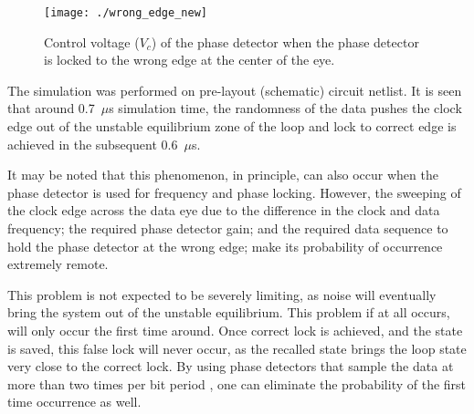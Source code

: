 \documentclass[journal,twoside,letterpaper]{IEEEtran}
\begin{document}
\begin{figure}[h!]
\centering
{}
\texttt{[image: ./wrong\_edge\_new]}
\caption{Control voltage ($V_c$) of the phase detector when the phase detector is locked
to the wrong edge at the center of the eye.}
\label{fig:Alex_wrong_edge}
\end{figure}

The
simulation was performed on pre-layout (schematic) circuit netlist. It is seen that
around \mbox{0.7 $\mu$s} simulation time, the randomness of the data pushes the clock edge out
of the unstable equilibrium zone of the loop and lock to correct edge is achieved in the subsequent
\mbox{0.6 $\mu$s.}

It may be noted that this phenomenon, in principle, can also occur when the phase detector
is used for frequency and phase locking. However, the sweeping of the clock edge across the
data eye due to the difference in the clock and data frequency; the required phase detector gain; and the required data sequence
to hold the phase detector at the wrong edge; make its probability of occurrence extremely remote.

This problem is not expected to be severely limiting, as noise will eventually
bring the system out of the unstable equilibrium. This problem if at all
occurs, will only occur the first time around. Once correct lock
is achieved, and the state is saved, this false lock will never occur,
as the recalled state brings the loop state very close to the correct lock.
By using phase detectors that sample the data at more than two times per bit
period \cite{oversampling_pd}, one can eliminate the probability of the first
time occurrence as well.



\end{document}
